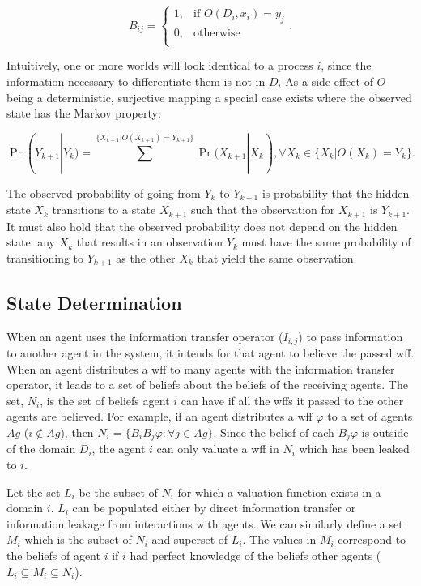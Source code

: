 \begin{equation}
 B_{ij} =
   \begin{cases}
    1, & \text{if } O(D_i, x_i) = y_j\\
    0, & \text{otherwise} \\
  \end{cases}.
\end{equation}

Intuitively, one or more worlds will look identical to a process $i$, since the information necessary to differentiate them is not in $D_i$
As a side effect of $O$ being a deterministic, surjective mapping a special case exists where the observed state has the Markov property:

\begin{equation}
    \Pr(Y_{k+1} | Y_{k}) = \sum^{\{X_{k+1} | O(X_{k+1}) = Y_{k+1}\}} \Pr(X_{k+1} | X_{k}), \forall X_k \in \{X_k | O(X_k) = Y_k\}.
\label{eq:hidden-to-chain}
\end{equation}

The observed probability of going from $Y_k$ to $Y_{k+1}$ is probability that the hidden state $X_k$ transitions to a state $X_{k+1}$ such that the observation for $X_{k+1}$ is $Y_{k+1}$.
It must also hold that the observed probability does not depend on the hidden state: any $X_k$ that results in an observation $Y_k$ must have the same probability of transitioning to $Y_{k+1}$ as the other $X_{k}$ that yield the same observation.

\subsection{State Determination}

When an agent uses the information transfer operator ($I_{i,j}$) to pass information to another agent in the system, it intends for that agent to believe the passed wff.
When an agent distributes a wff to many agents with the information transfer operator, it leads to a set of beliefs about the beliefs of the receiving agents.
The set, $N_i$, is the set of beliefs agent $i$ can have if all the wffs it passed to the other agents are believed.
For example, if an agent distributes a wff $\varphi$ to a set of agents $Ag$ ($i \not \in Ag$), then $N_i = \{ B_i B_j \varphi : \forall j \in Ag \}$.
Since the belief of each $B_j \varphi$ is outside of the domain $D_i$, the agent $i$ can only valuate a wff in $N_i$ which has been leaked to $i$.

Let the set $L_i$ be the subset of $N_i$ for which a valuation function exists in a domain $i$.
$L_i$ can be populated either by direct information transfer or information leakage from interactions with agents.
We can similarly define a set $M_i$ which is the subset of $N_i$ and superset of $L_i$.
The values in $M_i$ correspond to the beliefs of agent $i$ if $i$ had perfect knowledge of the beliefs other agents ($L_i \subseteq M_i \subseteq N_i$).


